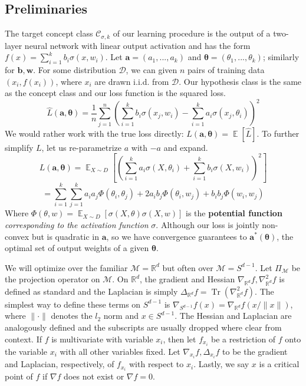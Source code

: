 \documentclass{article}
\newcommand{\R}{{\mathbb{R}}}
\DeclareMathOperator{\Tr}{Tr}
\DeclareMathOperator*{\expt}{\mathbb{E}}
\begin{document}
\subsection{Preliminaries}
The target concept class $\mathcal{C}_{\sigma,k}$ of our learning procedure is the output of a two-layer neural network with linear output activation and has the form $f(x) = \sum_{i=1}^k b_i\sigma(x,w_i)$. Let $\boldsymbol{a} = (a_1,...,a_k)$ and $\boldsymbol{\theta} = (\theta_1,...,\theta_k)$; similarly for $\boldsymbol{b}, \boldsymbol{w}$. For some distribution $\mathcal{D}$, we can given $n$ pairs of training data $(x_i, f(x_i))$, where $x_i$ are drawn i.i.d. from $\mathcal{D}$. Our hypothesis class is the same as the concept class and our loss function is the squared loss. 
%
\begin{equation}\label{errEmp}
\widehat{L}(\boldsymbol{a,\theta})  = \frac{1}{n}\sum_{j=1}^n \left(\sum_{i=1}^k b_i\sigma(x_j,w_i) - \sum_{i=1}^k a_i \sigma(x_j,\theta_i)\right)^2
\end{equation}
%
We would rather work with the true loss directly:
$L(\boldsymbol{a,\theta}) = \expt[\widehat{L}]$. To further simplify $L$, let us
re-parametrize $a$ with $-a$ and expand.
\begin{equation*}
L(\boldsymbol{a,\theta})  = \expt_{X\sim D}\left[ \left(  \sum_{i=1}^k a_i \sigma(X,\theta_i) + \sum_{i=1}^k b_i\sigma(X,w_i)\right)^2\right]
\end{equation*}
%
\begin{equation}\label{errLoss}
= \sum_{i=1}^k \sum_{j=1}^k a_i a_j \Phi(\theta_i,\theta_j)+ 2 a_ib_j \Phi(\theta_i,w_j)+ b_i b_j \Phi(w_i,w_j)   
\end{equation}
%
Where $\Phi(\theta, w) = \expt_{X\sim D}[ \sigma(X,\theta) \sigma(X,w)]$ is
the {\bf potential function} {\it corresponding to the activation function} $\sigma$. Although our loss is jointly non-convex but is quadratic in $\boldsymbol{a}$, so we have convergence guarantees to $\boldsymbol{a^*(\theta)}$, the optimal set of output weights of a given $\boldsymbol{\theta}$. 

We will optimize over the familiar $\mathcal{M}= \R^d$ but often over $\mathcal{M} = S^{d-1}$. Let $\Pi_\mathcal{M}$ be the projection operator on $\mathcal{M}$. On $\R^d$, the gradient and Hessian $\nabla_{\R^d} f, \nabla_{\R^d}^2 f$ is defined as standard and the Laplacian is simply $\Delta_{\R^d} f = \Tr(\nabla_{\R^d}^2 f)$. The simplest way to define these terms on $S^{d-1}$ is $\nabla_{S^{d-1}} f(x) = \nabla_{\R^d} f(x/\|x\|)$, where $\| \cdot \|$ denotes the $l_2$ norm and $x \in S^{d-1}$. The Hessian and Laplacian are analogously defined and the subscripts are usually dropped where clear from context. If $f$ is multivariate with variable $x_i$, then let $f_{x_i}$ be a
restriction of $f$ onto the variable $x_i$ with all other variables
fixed. Let $\nabla_{x_i}f, \Delta_{x_i}f$ to be the gradient and
Laplacian, respectively, of $f_{x_i}$ with respect to
$x_i$. Lastly, we say $x$ is a critical point of $f$ if $\nabla f$
does not exist or $\nabla f = 0$.
\end{document}
